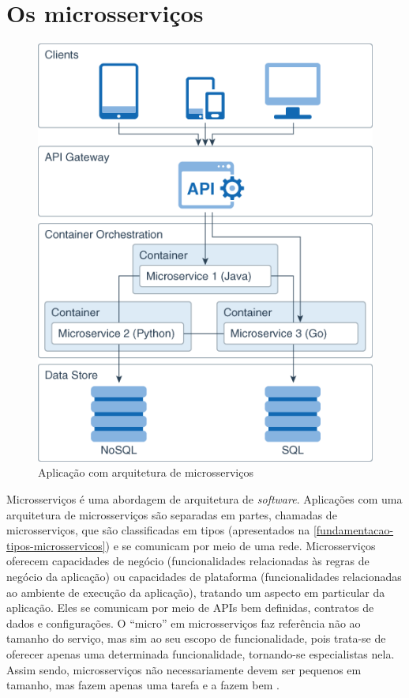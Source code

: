 \section{Os microsserviços}

\begin{figure}[htb]
	\caption{\label{figura_arquitetura_microsservicos}Aplicação com arquitetura de microsserviços}
	\begin{center}
	    \includegraphics[scale=0.5]{Imagens/microservice_architecture.png}
	\end{center}
\end{figure}

Microsserviços é uma abordagem de arquitetura de \emph{software}. Aplicações com uma arquitetura de microsserviços são separadas em partes, chamadas de microsserviços, que são classificadas em tipos (apresentados na \autoref{fundamentacao-tipos-microsservicos}) e se comunicam por meio de uma rede. Microsserviços oferecem capacidades de negócio (funcionalidades relacionadas às regras de negócio da aplicação) ou capacidades de plataforma (funcionalidades relacionadas ao ambiente de execução da aplicação), tratando um aspecto em particular da aplicação. Eles se comunicam por meio de APIs bem definidas, contratos de dados e configurações. O “micro” em microsserviços faz referência não ao tamanho do serviço, mas sim ao seu escopo de funcionalidade, pois trata-se de oferecer apenas uma determinada funcionalidade, tornando-se especialistas nela. Assim sendo, microsserviços não necessariamente devem ser pequenos em tamanho, mas fazem apenas uma tarefa e a fazem bem \cite{Familiar2015,livro-building-microservices}.
 
